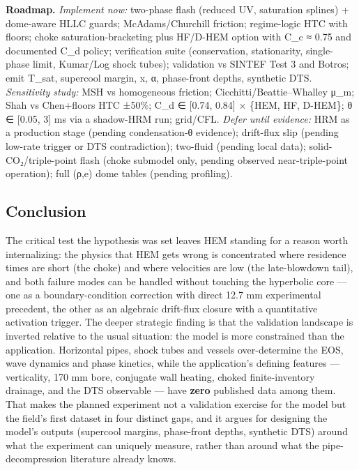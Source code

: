 \textbf{Roadmap.} \emph{Implement now:} two-phase flash (reduced UV,
saturation splines) + dome-aware HLLC guards; McAdams/Churchill
friction; regime-logic HTC with floors; choke saturation-bracketing plus
HF/D-HEM option with C\_c ≈ 0.75 and documented C\_d policy;
verification suite (conservation, stationarity, single-phase limit,
Kumar/Log shock tubes); validation vs SINTEF Test 3 and Botros; emit
T\_sat, supercool margin, x, α, phase-front depths, synthetic DTS.
\emph{Sensitivity study:} MSH vs homogeneous friction;
Cicchitti/Beattie--Whalley μ\_m; Shah vs Chen+floors HTC ±50\%; C\_d ∈
{[}0.74, 0.84{]} × \{HEM, HF, D-HEM\}; θ ∈ {[}0.05, 3{]} ms via a
shadow-HRM run; grid/CFL. \emph{Defer until evidence:} HRM as a
production stage (pending condensation-θ evidence); drift-flux slip
(pending low-rate trigger or DTS contradiction); two-fluid (pending
local data); solid-CO₂/triple-point flash (choke submodel only, pending
observed near-triple-point operation); full (ρ,e) dome tables (pending
profiling).

\hypertarget{conclusion}{%
\subsection{Conclusion}\label{conclusion}}

The critical test the hypothesis was set leaves HEM standing for a
reason worth internalizing: the physics that HEM gets wrong is
concentrated where residence times are short (the choke) and where
velocities are low (the late-blowdown tail), and both failure modes can
be handled without touching the hyperbolic core --- one as a
boundary-condition correction with direct 12.7 mm experimental
precedent, the other as an algebraic drift-flux closure with a
quantitative activation trigger. The deeper strategic finding is that
the validation landscape is inverted relative to the usual situation:
the model is more constrained than the application. Horizontal pipes,
shock tubes and vessels over-determine the EOS, wave dynamics and phase
kinetics, while the application's defining features --- verticality, 170
mm bore, conjugate wall heating, choked finite-inventory drainage, and
the DTS observable --- have \textbf{zero} published data among them.
That makes the planned experiment not a validation exercise for the
model but the field's first dataset in four distinct gaps, and it argues
for designing the model's outputs (supercool margins, phase-front
depths, synthetic DTS) around what the experiment can uniquely measure,
rather than around what the pipe-decompression literature already knows.
